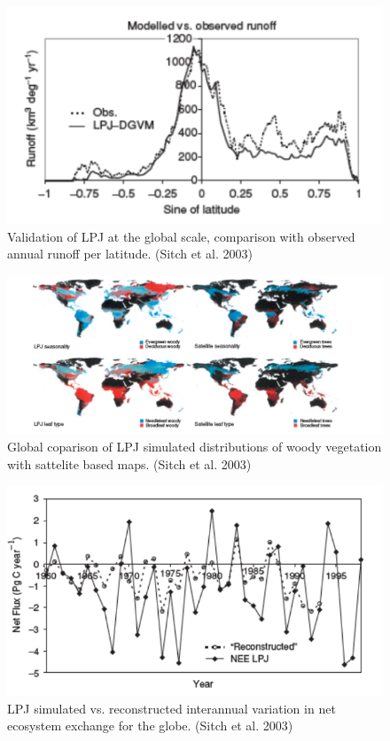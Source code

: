 \documentclass[12pt,oneside]{book}
\begin{document}
\begin{figure}

{\centering \includegraphics[width=0.8\linewidth]{figures/chap9/f912_sitch3} 

}

\caption{Validation of LPJ at the global scale, comparison with observed annual runoff per latitude. (Sitch et al. 2003)}\label{fig:f912}
\end{figure}

\begin{figure}

{\centering \includegraphics[width=0.8\linewidth]{figures/chap9/f913_sitch4} 

}

\caption{Global coparison of LPJ simulated distributions of woody vegetation with sattelite based maps. (Sitch et al. 2003)}\label{fig:f913}
\end{figure}

\begin{figure}

{\centering \includegraphics[width=0.8\linewidth]{figures/chap9/f914_sitch5} 

}

\caption{LPJ simulated vs. reconstructed interannual variation in net ecosystem exchange for the globe. (Sitch et al. 2003)}\label{fig:f914}
\end{figure}
\end{document}
